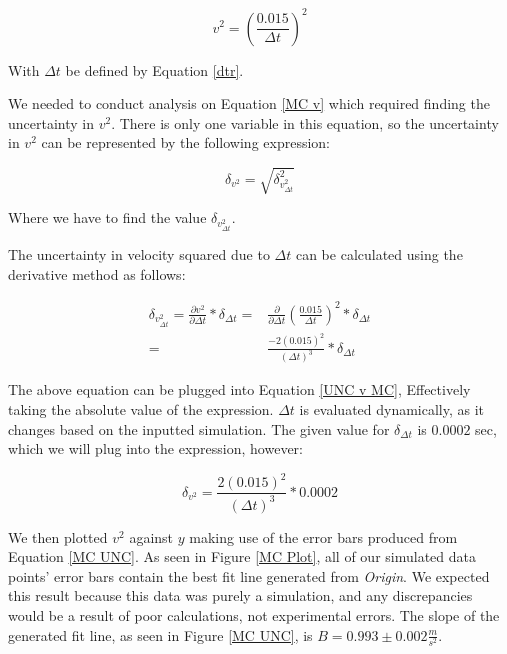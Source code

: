 \documentclass[12pt]{article}
\begin{document}
\begin{equation}
    v^2=(\frac{0.015}{\Delta t})^2 \label{MC v}
\end{equation}

\noindent With $\Delta t$ be defined by Equation \ref{dtr}. \par

We needed to conduct analysis on Equation \ref{MC v} which required finding the uncertainty in $v^2$. There is only one variable in this equation, so the uncertainty in $v^2$ can be represented by the following expression:

\begin{equation}
    \delta_{v^2}=\sqrt{\delta_{v^2_{\Delta t}}^2} \label{UNC v MC}
\end{equation}

\noindent Where we have to find the value $\delta_{v^2_{\Delta t}}$. \par

The uncertainty in velocity squared due to $\Delta t$ can be calculated using the derivative method as follows:

\begin{equation}
    \begin{split}
        \delta_{v^2_{\Delta t}}=\frac{\partial v^2}{\partial \Delta t}*\delta_{\Delta t}
        =&\frac{\partial}{\partial\Delta t}(\frac{0.015}{\Delta t})^2*\delta_{\Delta t} \\
        =&\frac{-2(0.015)^2}{(\Delta t)^3}*\delta_{\Delta t} \label{v derivative MC}
    \end{split}
\end{equation}

\noindent The above equation can be plugged into Equation \ref{UNC v MC}, Effectively taking the absolute value of the expression. $\Delta t$ is evaluated dynamically, as it changes based on the inputted simulation. The given value for $\delta_{\Delta t}$ is $0.0002$ sec, which we will plug into the expression, however:

\begin{equation}
    \delta_{v^2}= \frac{2(0.015)^2}{(\Delta t)^3}*0.0002 \label{MC UNC}
\end{equation}

\indent We then plotted $v^2$ against $y$ making use of the error bars produced from Equation \ref{MC UNC}. As seen in Figure \ref{MC Plot}, all of our simulated data points' error bars contain the best fit line generated from \textit{Origin}. We expected this result because this data was purely a simulation, and any discrepancies would be a result of poor calculations, not experimental errors. The slope of the generated fit line, as seen in Figure \ref{MC UNC}, is $B=0.993\pm0.002\frac{m}{s^2}$. \par
\end{document}
